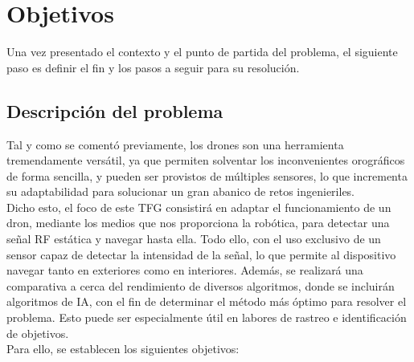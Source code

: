 \chapter{Objetivos}
\label{cap:capitulo2}

Una vez presentado el contexto y el punto de partida del problema, el siguiente paso es definir el fin y los pasos a seguir para su resolución.\\

\section{Descripción del problema}
\label{sec:descripcion_problema}

Tal y como se comentó previamente, los drones son una herramienta tremendamente versátil, ya que permiten solventar los inconvenientes orográficos de forma sencilla, y pueden ser provistos de múltiples sensores, lo que incrementa su adaptabilidad para solucionar un gran abanico de retos ingenieriles.\\

Dicho esto, el foco de este \ac{TFG} consistirá en adaptar el funcionamiento de un dron, mediante los medios que nos proporciona la robótica, para detectar una señal \ac{RF} estática y navegar hasta ella. Todo ello, con el uso exclusivo de un sensor capaz de detectar la intensidad de la señal, lo que permite al dispositivo navegar tanto en exteriores como en interiores. Además, se realizará una comparativa a cerca del rendimiento de diversos algoritmos, donde se incluirán algoritmos de \ac{IA}, con el fin de determinar el método más óptimo para resolver el problema. Esto puede ser especialmente útil en labores de rastreo e identificación de objetivos.\\

Para ello, se establecen los siguientes objetivos:

